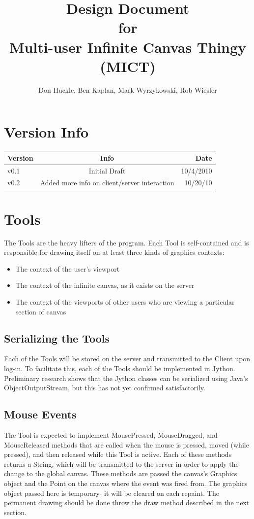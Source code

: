 \documentclass[11pt,oneside,a4paper]{article}
\title{Design Document \\ for \\ Multi-user Infinite Canvas Thingy (MICT)}
\author{Don Huckle, Ben Kaplan, Mark Wyrzykowski, Rob Wiesler}
\begin{document}
\maketitle
\tableofcontents
\pagebreak
\section{Version Info}

\begin{tabular}{| l | c | r |}  \hline
\textbf{Version} & \textbf{Info} & \textbf{Date} \\ \hline
v0.1 & Initial Draft & 10/4/2010 \\ \hline
v0.2 & Added more info on client/server interaction & 10/20/10 \\ \hline
\end{tabular}

\section{Tools}
  The Tools are the heavy lifters of the program. Each Tool is self-contained
  and is responsible for drawing itself on at least three kinds of graphics
  contexts:
 \begin{itemize}
  \item The context of the user's viewport
  \item The context of the infinite canvas, as it exists on the server
  \item The context of the viewports of other users who are viewing a particular section of canvas
 \end{itemize}

 \subsection{Serializing the Tools}
  Each of the Tools will be stored on the server and transmitted to the Client
  upon log-in. To facilitate this, each of the Tools should be implemented in
  Jython. Preliminary research shows that the Jython classes can be serialized
  using Java's ObjectOutputStream, but this has not yet confirmed satisfactorily.

 \subsection{Mouse Events}
  The Tool is expected to implement MousePressed, MouseDragged, and
  MouseReleased methods that are called when the mouse is pressed, moved (while
  pressed), and then released while this Tool is active. Each of these methods
  returns a String, which will be transmitted to the server in order to apply the
  change to the global canvas.  These methods are passed the canvas's Graphics
  object and the Point on the canvas where the event was fired from. The
  graphics object passed here is temporary- it will be cleared on each repaint.
  The permanent drawing should be done throw the draw method described in the
  next section.
\end{document}
